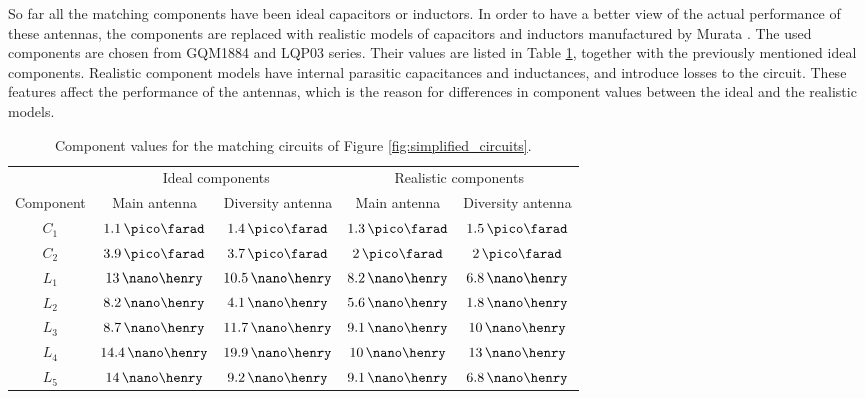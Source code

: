 So far all the matching components have been ideal capacitors or inductors. In order to have a better view of the actual performance of these antennas, the components are replaced with realistic models of capacitors and inductors manufactured by Murata \cite{murata}. The used components are chosen from GQM1884 \cite{murata_c} and LQP03 \cite{murata_l} series. Their values are listed in Table \ref{tab:match}, together with the previously mentioned ideal components. Realistic component models have internal parasitic capacitances and inductances, and introduce losses to the circuit. These features affect the performance of the antennas, which is the reason for differences in component values between the ideal and the realistic models.
\begin{table}[H]
    \centering
    \caption{Component values for the matching circuits of Figure \ref{fig:simplified_circuits}.}
    \label{tab:match}
    \begin{tabular}{|c|c|c|c|c|}
        \hline
         & \multicolumn{2}{|c|}{Ideal components} & \multicolumn{2}{|c|}{Realistic components} \\
         \cline{2-5}
         Component & Main antenna & Diversity antenna & Main antenna & Diversity antenna\\
         \hline
         $C_1$ & $1.1\,\pico\farad$ & $1.4\,\pico\farad$ & $1.3\,\pico\farad$ & $1.5\,\pico\farad$\\
         \hline
         $C_2$ & $3.9\,\pico\farad$ & $3.7\,\pico\farad$ & $2\,\pico\farad$ & $2\,\pico\farad$\\
         \hline
         $L_1$ & $13\,\nano\henry$ & $10.5\,\nano\henry$ & $8.2\,\nano\henry$ & $6.8\,\nano\henry$\\
         \hline
         $L_2$ & $8.2\,\nano\henry$ & $4.1\,\nano\henry$ & $5.6\,\nano\henry$ & $1.8\,\nano\henry$\\
         \hline
         $L_3$ & $8.7\,\nano\henry$ & $11.7\,\nano\henry$ & $9.1\,\nano\henry$ & $10\,\nano\henry$\\
         \hline
         $L_4$ & $14.4\,\nano\henry$ & $19.9\,\nano\henry$ & $10\,\nano\henry$ & $13\,\nano\henry$\\
         \hline
         $L_5$ & $14\,\nano\henry$ & $9.2\,\nano\henry$ & $9.1\,\nano\henry$ & $6.8\,\nano\henry$\\
         \hline
    \end{tabular}
\end{table}
\vspace{10pt}

